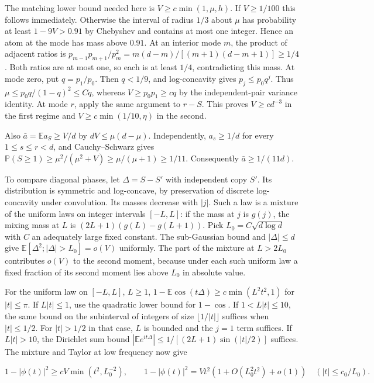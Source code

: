 The matching lower bound needed here is $V\ge c\min(1,\mu,h)$. If $V\ge1/100$ this follows immediately. Otherwise the interval of radius $1/3$ about $\mu$ has probability at least $1-9V>0.91$ by Chebyshev and contains at most one integer. Hence an atom at the mode has mass above $0.91$. At an interior mode $m$, the product of adjacent ratios is $p_{m-1}p_{m+1}/p_m^2=m(d-m)/[(m+1)(d-m+1)]\ge 1/4$. Both ratios are at most one, so each is at least $1/4$, contradicting this mass. At mode zero, put $q=p_1/p_0$. Then $q<1/9$, and log-concavity gives $p_j\le p_0 q^j$. Thus $\mu\le p_0 q/(1-q)^2\le Cq$, whereas $V\ge p_0p_1\ge c q$ by the independent-pair variance identity. At mode $r$, apply the same argument to $r-S$. This proves $V\ge c d^{-3}$ in the first regime and $V\ge c\min(1/10,\eta)$ in the second.

Also $\bar a=\mathbb E a_S\ge V/d$ by $dV\le\mu(d-\mu)$. Independently, $a_s\ge1/d$ for every $1\le s\le r<d$, and Cauchy--Schwarz gives $\mathbb P(S\ge1)\ge\mu^2/(\mu^2+V)\ge\mu/(\mu+1)\ge1/11$. Consequently $\bar a\ge1/(11d)$.

To compare diagonal phases, let $\Delta=S-S'$ with independent copy $S'$. Its distribution is symmetric and log-concave, by preservation of discrete log-concavity under convolution. Its masses decrease with $|j|$. Such a law is a mixture of the uniform laws on integer intervals $[-L,L]$: if the mass at $j$ is $g(j)$, the mixing mass at $L$ is $(2L+1)(g(L)-g(L+1))$. Pick $L_0=C\sqrt{d\log d}$ with $C$ an adequately large fixed constant. The sub-Gaussian bound and $|\Delta|\le d$ give $\mathbb E[\Delta^2;|\Delta|>L_0]=o(V)$ uniformly. The part of the mixture at $L>2L_0$ contributes $o(V)$ to the second moment, because under each such uniform law a fixed fraction of its second moment lies above $L_0$ in absolute value.

For the uniform law on $[-L,L]$, $L\ge1$, $1-\mathbb E\cos(t\Delta)\ge c\min(L^2t^2,1)$ for $|t|\le\pi$. If $L|t|\le1$, use the quadratic lower bound for $1-\cos$. If $1<L|t|\le 10$, the same bound on the subinterval of integers of size $\lfloor1/|t|\rfloor$ suffices when $|t|\le1/2$. For $|t|>1/2$ in that case, $L$ is bounded and the $j=1$ term suffices. If $L|t|>10$, the Dirichlet sum bound $|\mathbb E e^{it\Delta}|\le 1/[(2L+1)\sin(|t|/2)]$ suffices. The mixture and Taylor at low frequency now give

\begin{equation*}
1-|\phi(t)|^2\ge c V\min(t^2,L_0^{-2}),\qquad
1-|\phi(t)|^2=Vt^2(1+O(L_0^2t^2)+o(1))\quad (|t|\le c_0/L_0).
\end{equation*}

